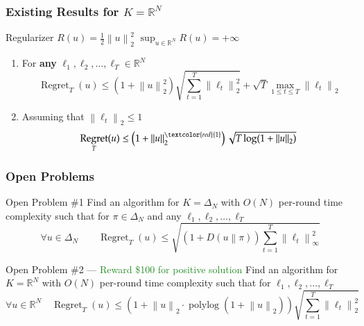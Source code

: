 \documentclass[usenames,dvipsnames]{beamer}
\DeclareMathOperator{\Regret}{Regret}
\DeclareMathOperator{\polylog}{polylog}
\newcommand{\R}{\mathbb{R}}
\newcommand{\norm}[1]{\left\|#1\right\|}
\newcommand{\KL}[2]{D\left({#1}\middle\|{#2}\right)}
\newcommand{\Cite}[1]{{\tiny \textcolor{Blue}{[#1]}}}
\begin{document}
\begin{frame}
\frametitle{Existing Results for $K=\R^N$}

Regularizer $R(u) = \frac{1}{2}\norm{u}_2^2$ \qquad $\sup_{u \in \R^N} R(u) = +\infty$

\vspace{1cm}

\begin{enumerate}

\item For \textbf{any} $\ell_1, \ell_2, \dots, \ell_T \in \R^N$ \qquad \Cite{OP'15}
$$
\Regret_T(u) \le \left( 1+\norm{u}_2^2 \right) \sqrt{\sum_{t=1}^T \norm{\ell_t}_2^2} + \sqrt{T} \max_{1 \le t \le T} \norm{\ell_t}_2
$$

\item Assuming that $\norm{\ell_t}_2 \le 1$ \qquad \Cite{SM'12, O'13, MA'13, MO'14, O'14, OP'16}
$$
\Regret_T(u) \le \left( 1 + \norm{u}_2^{\textcolor{red}{1}} \right) \sqrt{T \log(1+\norm{u}_2)}
$$
\end{enumerate}
\end{frame}

\begin{frame}
\frametitle{Open Problems}

\begin{block}{Open Problem \#1}
Find an algorithm for $K=\Delta_N$ with $O(N)$ per-round time complexity
such that for  $\pi \in \Delta_N$ and any $\ell_1, \ell_2, \dots, \ell_T$
$$
\forall u \in \Delta_N \qquad
\Regret_T(u) \le \sqrt{\left(1 + \KL{u}{\pi}\right) \sum_{t=1}^T \norm{\ell_t}_\infty^2}
$$
\end{block}

\begin{block}{Open Problem \#2 --- \textcolor{ForestGreen}{Reward \$100 for positive solution}}
Find an algorithm for $K=\R^N$ with $O(N)$ per-round time complexity
such that for  $\ell_1, \ell_2, \dots, \ell_T$
$$
\forall u \in \R^N \quad
\Regret_T(u) \le (1 + \norm{u}_2 \cdot \polylog(1+\norm{u}_2)) \sqrt{\sum_{t=1}^T \norm{\ell_t}_2^2}
$$
\end{block}
\end{frame}
\end{document}
